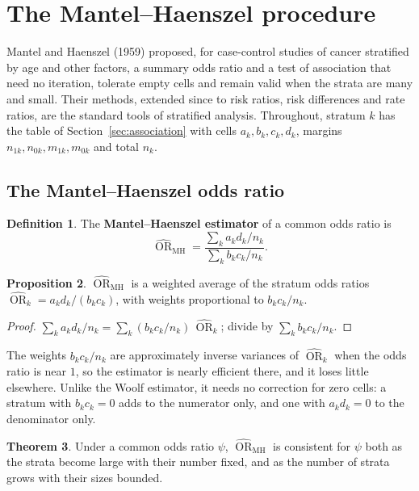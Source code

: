 \documentclass[11pt,a4paper]{article}
\numberwithin{equation}{section}
\DeclareMathOperator{\OR}{OR}
\theoremstyle{definition}
\newtheorem{thm}{Theorem}[subsection]
\newtheorem{defn}[thm]{Definition}
\newtheorem{prop}[thm]{Proposition}
\begin{document}
\section{The Mantel--Haenszel procedure}
\label{sec:mh}

Mantel and Haenszel (1959) proposed, for case-control studies of cancer stratified by age and other factors, a summary odds ratio and a
test of association that need no iteration, tolerate empty cells and remain valid when the strata are many and small. Their methods,
extended since to risk ratios, risk differences and rate ratios, are the standard tools of stratified analysis. Throughout, stratum $k$ has
the table of Section~\ref{sec:association} with cells $a_k, b_k, c_k, d_k$, margins $n_{1k}, n_{0k}, m_{1k}, m_{0k}$ and total $n_k$.

\subsection{The Mantel--Haenszel odds ratio}

\begin{defn}
The \textbf{Mantel--Haenszel estimator} of a common odds ratio is
\[
\widehat{\OR}_{\text{MH}} = \frac{\sum_k a_k d_k/n_k}{\sum_k b_k c_k/n_k} .
\]
\end{defn}

\begin{prop}
\label{prop:mhweights}
$\widehat{\OR}_{\text{MH}}$ is a weighted average of the stratum odds ratios $\widehat{\OR}_k = a_k d_k/(b_k c_k)$, with weights proportional to $b_k c_k/n_k$.
\end{prop}

\begin{proof}
$\sum_k a_k d_k/n_k = \sum_k (b_k c_k/n_k)\,\widehat{\OR}_k$; divide by $\sum_k b_k c_k/n_k$.
\end{proof}

The weights $b_k c_k/n_k$ are approximately inverse variances of $\widehat{\OR}_k$ when the odds ratio is near $1$, so the estimator is nearly efficient
there, and it loses little elsewhere. Unlike the Woolf estimator, it needs no correction for zero cells: a stratum with $b_k c_k = 0$ adds to
the numerator only, and one with $a_k d_k = 0$ to the denominator only.

\begin{thm}
\label{thm:mhconsistent}
Under a common odds ratio $\psi$, $\widehat{\OR}_{\text{MH}}$ is consistent for $\psi$ both as the strata become large with their number fixed, and as the
number of strata grows with their sizes bounded.
\end{thm}
\end{document}
